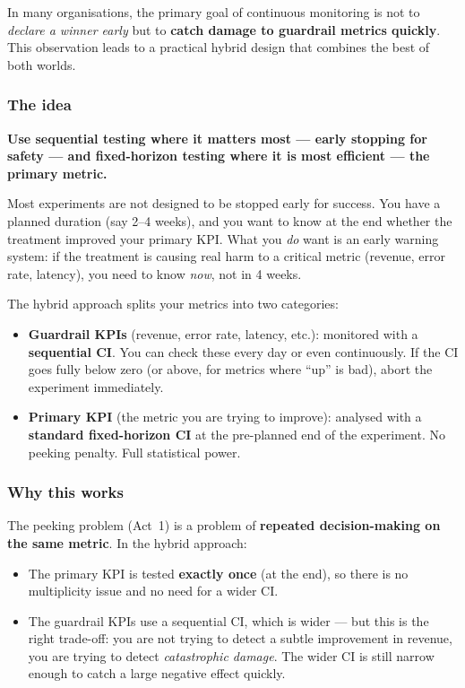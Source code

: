 \documentclass[12pt, a4paper]{article}
\begin{document}
In many organisations, the primary goal of continuous monitoring is not to
\emph{declare a winner early} but to \textbf{catch damage to guardrail
metrics quickly}.  This observation leads to a practical hybrid design
that combines the best of both worlds.

\subsubsection*{The idea}

\begin{intuition}
\textbf{Use sequential testing where it matters most --- early stopping for
safety --- and fixed-horizon testing where it is most efficient --- the
primary metric.}

Most experiments are not designed to be stopped early for success.  You have
a planned duration (say 2--4 weeks), and you want to know at the end whether
the treatment improved your primary KPI.  What you \emph{do} want is an
early warning system: if the treatment is causing real harm to a critical
metric (revenue, error rate, latency), you need to know \emph{now}, not in
4 weeks.

The hybrid approach splits your metrics into two categories:
\begin{itemize}[nosep]
  \item \textbf{Guardrail KPIs} (revenue, error rate, latency, etc.):
        monitored with a \textbf{sequential CI}.  You can check these every
        day or even continuously.  If the CI goes fully below zero (or above,
        for metrics where ``up'' is bad), abort the experiment immediately.
  \item \textbf{Primary KPI} (the metric you are trying to improve):
        analysed with a \textbf{standard fixed-horizon CI} at the
        pre-planned end of the experiment.  No peeking penalty.  Full
        statistical power.
\end{itemize}
\end{intuition}

\subsubsection*{Why this works}

The peeking problem (Act~1) is a problem of \textbf{repeated decision-making
on the same metric}.  In the hybrid approach:

\begin{itemize}[nosep]
  \item The primary KPI is tested \textbf{exactly once} (at the end), so
        there is no multiplicity issue and no need for a wider CI.
  \item The guardrail KPIs use a sequential CI, which is wider --- but this
        is the right trade-off: you are not trying to detect a subtle
        improvement in revenue, you are trying to detect \emph{catastrophic
        damage}.  The wider CI is still narrow enough to catch a large
        negative effect quickly.
\end{itemize}
\end{document}
